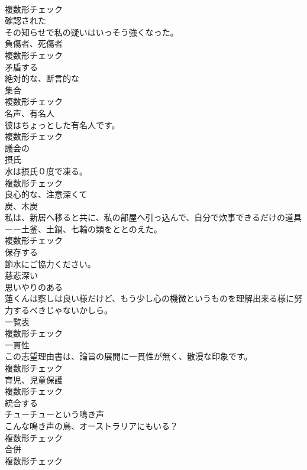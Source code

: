 \documentclass[8pt]{extreport}
\begin{document}
\begin{CJK}{UTF8}{min}
\\	複数形チェック
\\	[形容詞]	確認された	
\\	その知らせで私の疑いはいっそう強くなった。	
\\	[名詞]	負傷者、死傷者	
\\	複数形チェック
\\	[形容詞]	矛盾する	
\\	[形容詞]	絶対的な、断言的な	
\\	[名詞]	集合	
\\	複数形チェック
\\	[名詞]	名声、有名人	
\\	彼はちょっとした有名人です。	
\\	複数形チェック
\\	[形容詞]	議会の	
\\	[名詞]	摂氏	
\\	水は摂氏０度で凍る。	
\\	複数形チェック
\\	[形容詞]	良心的な、注意深くて	
\\	[名詞]	炭、木炭	
\\	私は、新居へ移ると共に、私の部屋へ引っ込んで、自分で炊事できるだけの道具ーー土釜、土鍋、七輪の類をととのえた。	
\\	複数形チェック
\\	[動詞]	保存する	
\\	節水にご協力ください。	
\\	[形容詞]	慈悲深い	
\\	[形容詞]	思いやりのある	
\\	蓮くんは察しは良い様だけど、もう少し心の機微というものを理解出来る様に努力するべきじゃないかしら。	
\\	[名詞]	一覧表	
\\	複数形チェック
\\	[名詞]	一貫性	
\\	この志望理由書は、論旨の展開に一貫性が無く、散漫な印象です。	
\\	複数形チェック
\\	[名詞]	育児、児童保護	
\\	複数形チェック
\\	[動詞]	統合する	
\\	[名詞]	チューチューという鳴き声	
\\	こんな鳴き声の鳥、オーストラリアにもいる？	
\\	複数形チェック
\\	[名詞]	合併	
\\	複数形チェック

\end{CJK}
\end{document}
